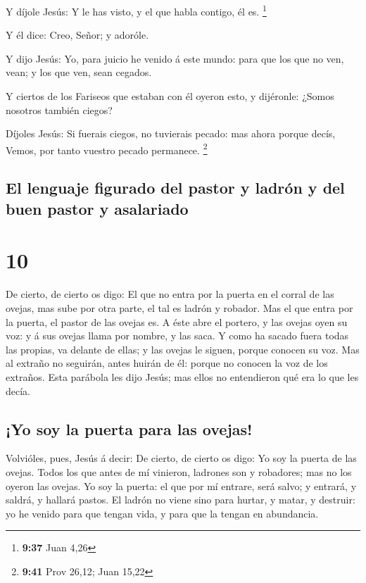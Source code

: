  Y díjole Jesús: Y le has visto, y el que habla contigo, él
es. \footnote{\textbf{9:37} Juan 4,26}

 Y él dice: Creo, Señor; y adoróle.

 Y dijo Jesús: Yo, para juicio he venido á este mundo: para
que los que no ven, vean; y los que ven, sean cegados.

 Y ciertos de los Fariseos que estaban con él oyeron esto,
y dijéronle: ¿Somos nosotros también ciegos?

 Díjoles Jesús: Si fuerais ciegos, no tuvierais pecado: mas
ahora porque decís, Vemos, por tanto vuestro pecado permanece.
\footnote{\textbf{9:41} Prov 26,12; Juan 15,22}

\hypertarget{el-lenguaje-figurado-del-pastor-y-ladruxf3n-y-del-buen-pastor-y-asalariado}{%
\subsection{El lenguaje figurado del pastor y ladrón y del buen pastor y
asalariado}\label{el-lenguaje-figurado-del-pastor-y-ladruxf3n-y-del-buen-pastor-y-asalariado}}

\hypertarget{section-9}{%
\section{10}\label{section-9}}

 De cierto, de cierto os digo: El que no entra por la puerta
en el corral de las ovejas, mas sube por otra parte, el tal es ladrón y
robador.  Mas el que entra por la puerta, el pastor de las
ovejas es.  A éste abre el portero, y las ovejas oyen su
voz: y á sus ovejas llama por nombre, y las saca.  Y como ha
sacado fuera todas las propias, va delante de ellas; y las ovejas le
siguen, porque conocen su voz.  Mas al extraño no seguirán,
antes huirán de él: porque no conocen la voz de los extraños.
 Esta parábola les dijo Jesús; mas ellos no entendieron qué
era lo que les decía.

\hypertarget{yo-soy-la-puerta-para-las-ovejas}{%
\subsection{¡Yo soy la puerta para las
ovejas!}\label{yo-soy-la-puerta-para-las-ovejas}}

 Volvióles, pues, Jesús á decir: De cierto, de cierto os
digo: Yo soy la puerta de las ovejas.  Todos los que antes
de mí vinieron, ladrones son y robadores; mas no los oyeron las ovejas.
 Yo soy la puerta: el que por mí entrare, será salvo; y
entrará, y saldrá, y hallará pastos.  El ladrón no viene
sino para hurtar, y matar, y destruir: yo he venido para que tengan
vida, y para que la tengan en abundancia.

